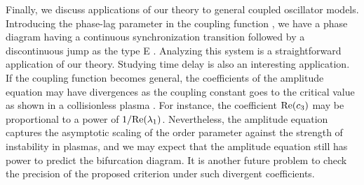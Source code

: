 Finally, we discuss applications of our theory
to general coupled oscillator models.
Introducing the phase-lag parameter in the coupling function
\cite{sakaguchi-kuramoto-86},
we have a phase diagram having a continuous synchronization transition
followed by a discontinuous jump as the type E
\cite{omelchenko-wolfrum-12}.
Analyzing this system is a straightforward application of our theory.
Studying time delay \cite{yeung-strogatz-99,montbrio-pazo-schmidt-06}
is also an interesting application.
If the coupling function becomes general,
the coefficients of the amplitude equation may have
divergences as the coupling constant goes to the critical value
  as shown in a collisionless plasma \cite{crawford1995b}.
For instance, the coefficient ${\rm Re}(c_{3})$ may be proportional to
a power of $1/{\rm Re}(\lambda_{1})$.
  Nevertheless, the amplitude equation captures the asymptotic
  scaling of the order parameter against the strength of instability
  in plasmas, and we may expect that the amplitude equation still has power
  to predict the bifurcation diagram.
It is another future problem to check
the precision of the proposed criterion under such divergent coefficients.




